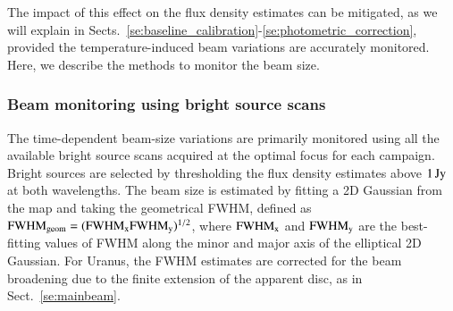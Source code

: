 The impact of this effect on the flux density estimates can be
mitigated, as we will explain in
Sects.~\ref{se:baseline_calibration}-\ref{se:photometric_correction},
provided the temperature-induced beam variations are accurately
monitored. Here, we describe the methods to monitor the beam size.   


\subsubsection{Beam monitoring using bright source scans}
\label{se:beam_monitoring_otf}

The time-dependent beam-size variations are primarily monitored using
all the available bright source scans acquired at the optimal focus
for each campaign. Bright sources are selected by thresholding the
flux density estimates above $1\,\rm{Jy}$ at both wavelengths.
The beam size is estimated by fitting a 2D Gaussian from the map and
taking the geometrical FWHM, defined as 
$\rm{FWHM}_{\rm{geom}} = (\rm{FWHM}_x \rm{FWHM}_y)^{1/2}$, where
$\rm{FWHM}_x$ and $\rm{FWHM}_y$ are the best-fitting values of FWHM
along the minor and major axis of the elliptical 2D Gaussian.
For Uranus, the FWHM estimates are corrected for the beam broadening due
to the finite extension of the apparent disc, as in Sect.~\ref{se:mainbeam}. 

